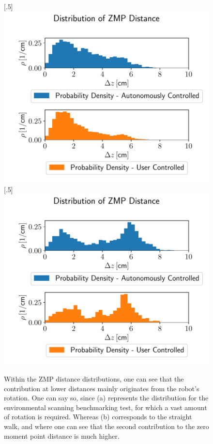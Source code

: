 \begin{figure}[h!] 
	[.5\linewidth]{\includegraphics[scale=.45]{chapters/11_autonomous_walking_experiments/img/zmp_distribution_sight.pdf}}
	[.5\linewidth]{\includegraphics[scale=.45]{chapters/11_autonomous_walking_experiments/img/zmp_distribution_straight.pdf}}
	\caption{Within the ZMP distance distributions, one can see that the contribution at lower distances mainly originates from the robot's rotation. One can say so, since (a) represents the distribution for the environmental scanning benchmarking test, for which a vast amount of rotation is required. Whereas (b) corresponds to the straight walk, and where one can see that the second contribution to the zero moment point distance is much higher.}
	\label{fig::1112_aw_zmp_dist_split}
\end{figure} 
